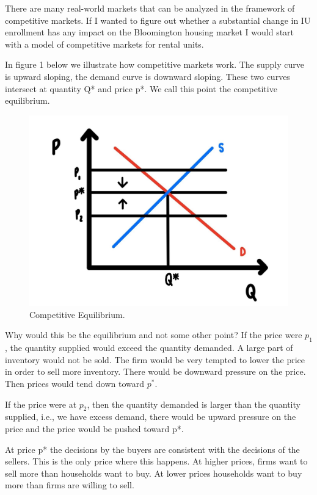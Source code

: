 \documentclass[
]{book}
\begin{document}
There are many real-world markets that can be analyzed in the framework of competitive markets. If I wanted to figure out whether a substantial change in IU enrollment has any impact on the Bloomington housing market I would start with a model of competitive markets for rental units.

In figure 1 below we illustrate how competitive markets work. The supply curve is upward sloping, the demand curve is downward sloping. These two curves intersect at quantity Q* and price p*. We call this point the competitive equilibrium.

\begin{figure}

{\centering \includegraphics[width=0.75\linewidth]{img/compmarkets/fig1} 

}

\caption{Competitive Equilibrium.}\label{fig:compmarkets01}
\end{figure}

Why would this be the equilibrium and not some other point? If the price were \(p_1\), the quantity supplied would exceed the quantity demanded. A large part of inventory would not be sold. The firm would be very tempted to lower the price in order to sell more inventory. There would be downward pressure on the price. Then prices would tend down toward \(p^*\).

If the price were at \(p_2\), then the quantity demanded is larger than the quantity supplied, i.e., we have excess demand, there would be upward pressure on the price and the price would be pushed toward p*.

At price p* the decisions by the buyers are consistent with the decisions of the sellers. This is the only price where this happens. At higher prices, firms want to sell more than households want to buy. At lower prices households want to buy more than firms are willing to sell.
\end{document}
